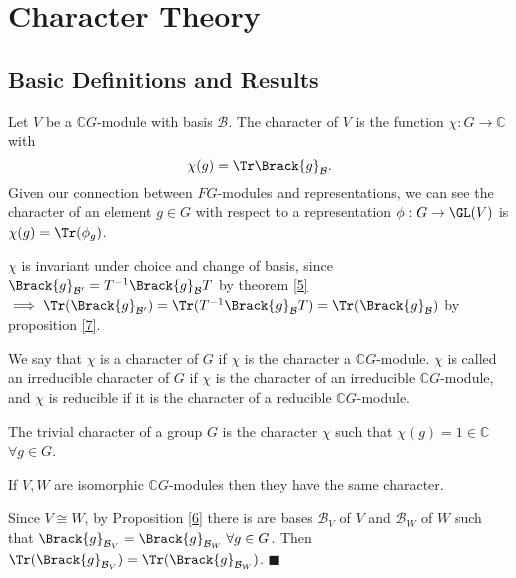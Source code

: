 \documentclass[../Project.tex]{subfiles}
\begin{document}
\newpage
\section{Character Theory}
\subsection{Basic Definitions and Results}
\begin{defi}
	Let $V$ be a $\mathbb{C}G$-module with basis $\mathcal{B}$. The character of $V$ is the function $\chi : G \to \mathbb{C}$ with
	$$\chi(g) = \Tr\Brack{g}_\mathcal{B}.$$
	Given our connection between $FG$-modules and representations, we can see the character of an element $g \in G$ with respect to a representation $\phi : G \to \GL(V)$ is $\chi(g) = \Tr(\phi_g)$.\\
\end{defi}

\begin{prop}[\cite{2}]
$\chi$ is invariant under choice and change of basis, since
$\Brack{g}_{\mathcal{B}'} = T^{-1}\Brack{g}_\mathcal{B}T$ by theorem \ref{5} $\implies \Tr(\Brack{g}_{\mathcal{B}'}) = \Tr(T^{-1}\Brack{g}_\mathcal{B}T) = \Tr(\Brack{g}_\mathcal{B})$ by proposition \ref{7}.
\end{prop}

\begin{defi}
	We say that $\chi$ is a character of $G$ if $\chi$ is the character a $\mathbb{C}G$-module. $\chi$ is called an irreducible character of $G$ if $\chi$ is the character of an irreducible $\mathbb{C}G$-module, and $\chi$ is reducible if it is the character of a reducible $\mathbb{C}G$-module.
\end{defi}

\begin{defi}
	The trivial character of a group $G$ is the character $\chi$ such that $\chi(g) = 1 \in \mathbb{C}$ $\forall g \in G$.
\end{defi}


\begin{prop}[\cite{2}]
	If $V,W$ are isomorphic $\mathbb{C}G$-modules then they have the same character.
\end{prop}
\begin{proo*}[\cite{2}]
	Since $V\cong W$, by Proposition \ref{6} there is are bases $\mathcal{B}_V$ of $V$ and $\mathcal{B}_W$ of $W$ such that $\Brack{g}_{\mathcal{B}_V} = \Brack{g}_{\mathcal{B}_W}\;\forall g \in G$. Then $\Tr(\Brack{g}_{\mathcal{B}_V}) = \Tr(\Brack{g}_{\mathcal{B}_W})$. $\blacksquare$
\end{proo*}
\end{document}
